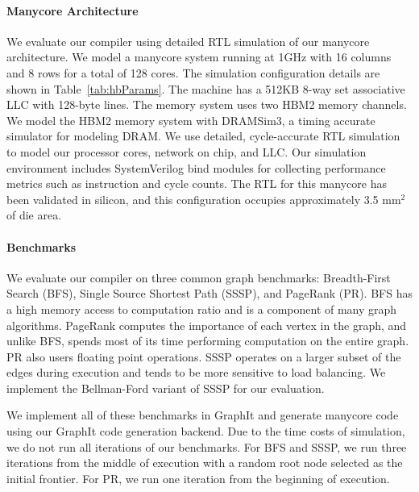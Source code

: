 \paragraph{Manycore Architecture}
\tabHBParams
We evaluate our compiler using detailed RTL simulation of our manycore architecture.
We model a manycore system running at 1GHz with 16 columns and 8 rows for a total of 128 cores.
The simulation configuration details are shown in Table~\ref{tab:hbParams}.
The machine has a 512KB 8-way set associative LLC with 128-byte lines.
The memory system uses two HBM2 memory channels.
We model the HBM2 memory system with DRAMSim3\cite{li2019dramsim3},  a timing accurate simulator for modeling DRAM.
We use detailed, cycle-accurate RTL simulation to model our processor cores, network on chip, and LLC.
Our simulation environment includes SystemVerilog bind modules for collecting performance metrics such as instruction and cycle counts.
The RTL for this manycore has been validated in silicon, and this configuration occupies approximately 3.5 mm$^2$ of die area. 


\paragraph{Benchmarks} We evaluate our compiler on three common graph benchmarks: Breadth-First Search (BFS), Single Source Shortest Path (SSSP), and PageRank (PR). 
BFS has a high memory access to computation ratio and is a component of many graph algorithms.
PageRank computes the importance of each vertex in the graph, and unlike BFS, spends most of its time performing computation on the entire graph.
PR also users floating point operations.
SSSP operates on a larger subset of the edges during execution and tends to be more sensitive to load balancing.
We implement the Bellman-Ford variant of SSSP for our evaluation.

We implement all of these benchmarks in GraphIt and generate manycore code using our GraphIt code generation backend.
Due to the time costs of simulation, we do not run all iterations of our benchmarks. 
For BFS and SSSP, we run three iterations from the middle of execution with a random root node selected as the initial frontier.
For PR, we run one iteration from the beginning of execution.



